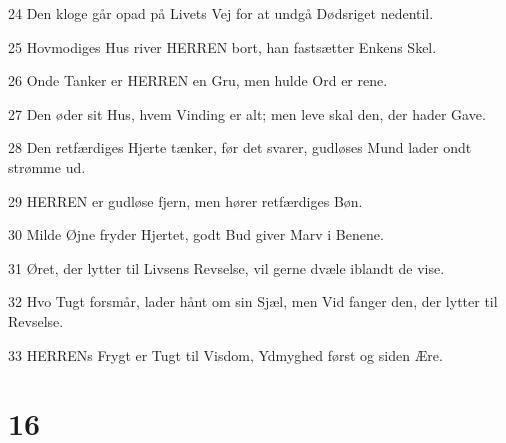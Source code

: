 \par 24 Den kloge går opad på Livets Vej for at undgå Dødsriget nedentil.
\par 25 Hovmodiges Hus river HERREN bort, han fastsætter Enkens Skel.
\par 26 Onde Tanker er HERREN en Gru, men hulde Ord er rene.
\par 27 Den øder sit Hus, hvem Vinding er alt; men leve skal den, der hader Gave.
\par 28 Den retfærdiges Hjerte tænker, før det svarer, gudløses Mund lader ondt strømme ud.
\par 29 HERREN er gudløse fjern, men hører retfærdiges Bøn.
\par 30 Milde Øjne fryder Hjertet, godt Bud giver Marv i Benene.
\par 31 Øret, der lytter til Livsens Revselse, vil gerne dvæle iblandt de vise.
\par 32 Hvo Tugt forsmår, lader hånt om sin Sjæl, men Vid fanger den, der lytter til Revselse.
\par 33 HERRENs Frygt er Tugt til Visdom, Ydmyghed først og siden Ære.

\chapter{16}

